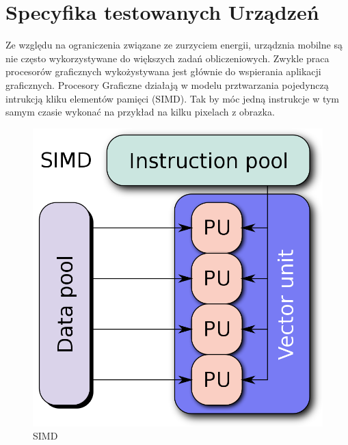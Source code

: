 \section[Specyfika testowanych Urządzeń]{Specyfika testowanych Urządzeń}
Ze względu na ograniczenia związane ze zurzyciem energii, urządznia mobilne są nie często wykorzystywane do większych zadań obliczeniowych. Zwykle praca procesorów graficznych wykożystywana jest głównie do wspierania aplikacji graficznych. Procesory Graficzne działają w modelu prztwarzania pojedynczą intrukcją kliku elementów pamięci (SIMD). Tak by móc jedną instrukcje w tym samym czasie wykonać na przykład na kilku pixelach z obrazka. 
\begin{figure}[H]
	\includegraphics[scale=0.16]{imgs/SIMD2.svg.png}
	\caption{SIMD}
\end{figure}

